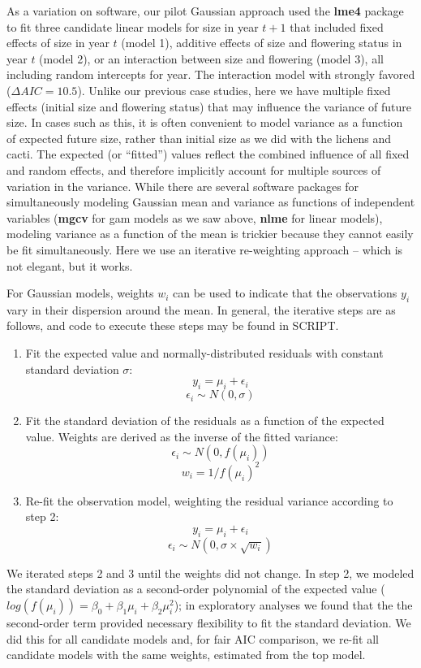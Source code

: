 \documentclass[12pt]{article}
\begin{document}
As a variation on software, our pilot Gaussian approach used the \textbf{lme4} package to fit three candidate linear models for size in year $t+1$  that included fixed effects of size in year $t$ (model 1), additive effects of size and flowering status in year $t$ (model 2), or an interaction between size and flowering (model 3), all including random intercepts for year. 
The interaction model with strongly favored ($\Delta AIC = 10.5$). 
Unlike our previous case studies, here we have multiple fixed effects (initial size and flowering status) that may influence the variance of future size. 
In cases such as this, it is often convenient to model variance as a function of expected future size, rather than initial size as we did with the lichens and cacti. 
The expected (or ``fitted'') values reflect the combined influence of all fixed and random effects, and therefore implicitly account for multiple sources of variation in the variance. 
While there are several software packages for simultaneously modeling Gaussian mean and variance as functions of independent variables (\textbf{mgcv} for gam models as we saw above, \textbf{nlme} for linear models), modeling variance as a function of the mean is trickier because they cannot easily be fit simultaneously. 
Here we use an iterative re-weighting approach -- which is not elegant, but it works. 

For Gaussian models, weights $w_{i}$ can be used to indicate that the observations $y_{i}$ vary in their dispersion around the mean. 
In general, the iterative steps are as follows, and code to execute these steps may be found in SCRIPT. 
\begin{enumerate}
	\item Fit the expected value and normally-distributed residuals with constant standard deviation $\sigma$:
	$$y_{i} = \mu_{i} + \epsilon_{i}$$
	$$\epsilon_{i} \sim N(0,\sigma)$$
	\item Fit the standard deviation of the residuals as a function of the expected value. Weights are derived as the inverse of the fitted variance:
	$$\epsilon_{i} \sim N(0,f(\mu_{i}))$$
	$$w_{i}=1/{f(\mu_{i})^2}$$
	\item Re-fit the observation model, weighting the residual variance according to step 2:
	$$y_{i} = \mu_{i} + \epsilon_{i}$$
	$$\epsilon_{i} \sim N(0,\sigma \times \sqrt{w_{i}})$$	
\end{enumerate}
We iterated steps 2 and 3 until the weights did not change. 
In step 2, we modeled the standard deviation as a second-order polynomial of the expected value ($log(f(\mu_{i}))=\beta_{0}+\beta_{1}\mu_{i}+\beta_{2}\mu_{i}^2$); in exploratory analyses we found that the the second-order term provided necessary flexibility to fit the standard deviation. 
We did this for all candidate models and, for fair AIC comparison, we re-fit all candidate models with the same weights, estimated from the top model. 
\end{document}

